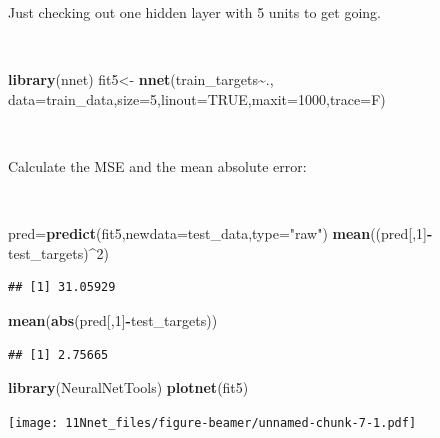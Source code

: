 \documentclass[
  10pt,
  ignorenonframetext,
  twocolumn]{beamer}
\newenvironment{Shaded}{\begin{snugshade}}{\end{snugshade}}
\newcommand{\AttributeTok}[1]{\textcolor[rgb]{0.13,0.29,0.53}{#1}}
\newcommand{\ConstantTok}[1]{\textcolor[rgb]{0.56,0.35,0.01}{#1}}
\newcommand{\DecValTok}[1]{\textcolor[rgb]{0.00,0.00,0.81}{#1}}
\newcommand{\FunctionTok}[1]{\textcolor[rgb]{0.13,0.29,0.53}{\textbf{#1}}}
\newcommand{\NormalTok}[1]{#1}
\newcommand{\OtherTok}[1]{\textcolor[rgb]{0.56,0.35,0.01}{#1}}
\newcommand{\SpecialCharTok}[1]{\textcolor[rgb]{0.81,0.36,0.00}{\textbf{#1}}}
\newcommand{\StringTok}[1]{\textcolor[rgb]{0.31,0.60,0.02}{#1}}
\begin{document}
\begin{frame}[fragile]
Just checking out one hidden layer with 5 units to get going.

\(~\)

\scriptsize

\begin{Shaded}
\begin{Highlighting}[]
\FunctionTok{library}\NormalTok{(nnet)}
\NormalTok{fit5}\OtherTok{\textless{}{-}} \FunctionTok{nnet}\NormalTok{(train\_targets}\SpecialCharTok{\textasciitilde{}}\NormalTok{., }\AttributeTok{data=}\NormalTok{train\_data,}\AttributeTok{size=}\DecValTok{5}\NormalTok{,}\AttributeTok{linout=}\ConstantTok{TRUE}\NormalTok{,}\AttributeTok{maxit=}\DecValTok{1000}\NormalTok{,}\AttributeTok{trace=}\NormalTok{F)}
\end{Highlighting}
\end{Shaded}

\(~\)

\normalsize

Calculate the MSE and the mean absolute error:

\(~\) \scriptsize

\begin{Shaded}
\begin{Highlighting}[]
\NormalTok{pred}\OtherTok{=}\FunctionTok{predict}\NormalTok{(fit5,}\AttributeTok{newdata=}\NormalTok{test\_data,}\AttributeTok{type=}\StringTok{"raw"}\NormalTok{)}
\FunctionTok{mean}\NormalTok{((pred[,}\DecValTok{1}\NormalTok{]}\SpecialCharTok{{-}}\NormalTok{test\_targets)}\SpecialCharTok{\^{}}\DecValTok{2}\NormalTok{)}
\end{Highlighting}
\end{Shaded}

\begin{verbatim}
## [1] 31.05929
\end{verbatim}

\begin{Shaded}
\begin{Highlighting}[]
\FunctionTok{mean}\NormalTok{(}\FunctionTok{abs}\NormalTok{(pred[,}\DecValTok{1}\NormalTok{]}\SpecialCharTok{{-}}\NormalTok{test\_targets))}
\end{Highlighting}
\end{Shaded}

\begin{verbatim}
## [1] 2.75665
\end{verbatim}
\end{frame}

\begin{frame}[fragile]
\begin{Shaded}
\begin{Highlighting}[]
\FunctionTok{library}\NormalTok{(NeuralNetTools)}
\FunctionTok{plotnet}\NormalTok{(fit5)}
\end{Highlighting}
\end{Shaded}

\texttt{[image: 11Nnet\_files/figure-beamer/unnamed-chunk-7-1.pdf]}
\end{frame}
\end{document}
